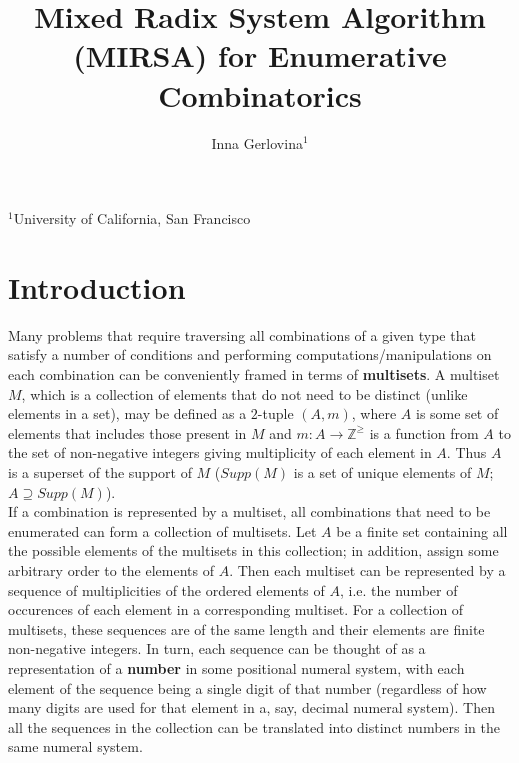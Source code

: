 \documentclass[12pt]{article}
\begin{document}

\title{Mixed Radix System Algorithm (MIRSA) for Enumerative Combinatorics}
\author{Inna Gerlovina$^{1}$}
\maketitle

\begin{footnotesize}
 \noindent $^1$University of California, San Francisco
\end{footnotesize}
\begin{center}
\end{center}

\section{Introduction}

Many problems that require traversing all combinations of a given type that satisfy a number of conditions and performing computations/manipulations on each combination can be conveniently framed in terms of \textbf{multisets}. A multiset $M$, which is a collection of elements that do not need to be distinct (unlike elements in a set), may be defined as a $2$-tuple $(A, m)$, where $A$ is some set of elements that includes those present in $M$ and $m:A \to \mathbb{Z}^{\geqslant}$ is a function from $A$ to the set of non-negative integers giving multiplicity of each element in $A$. Thus $A$ is a superset of the support of $M$ ($Supp(M)$ is a set of unique elements of $M$; $A \supseteq Supp(M)$). \\

If a combination is represented by a multiset, all combinations that need to be enumerated can form a collection of multisets. Let $A$ be a finite set containing all the possible elements of the multisets in this collection; in addition, assign some arbitrary order to the elements of $A$. Then each multiset can be represented by a sequence of multiplicities of the ordered elements of $A$, i.e. the number of occurences of each element in a corresponding multiset. For a collection of multisets, these sequences are of the same length and their elements are finite non-negative integers. In turn, each sequence can be thought of as a representation of a \textbf{number} in some positional numeral system, with each element of the sequence being a single digit of that number (regardless of how many digits are used for that element in a, say, decimal numeral system). Then all the sequences in the collection can be translated into distinct numbers in the same numeral system. \\
\end{document}
